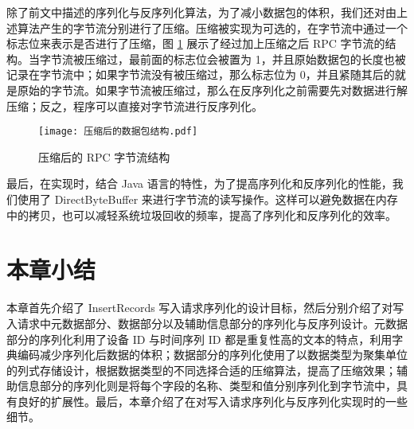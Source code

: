 除了前文中描述的序列化与反序列化算法，为了减小数据包的体积，我们还对由上述算法产生的字节流分别进行了压缩。压缩被实现为可选的，在字节流中通过一个标志位来表示是否进行了压缩，图 \ref{fig:compress-rpc-buffers} 展示了经过加上压缩之后 RPC 字节流的结构。当字节流被压缩过，最前面的标志位会被置为 1，并且原始数据包的长度也被记录在字节流中；如果字节流没有被压缩过，那么标志位为 0，并且紧随其后的就是原始的字节流。如果字节流被压缩过，那么在反序列化之前需要先对数据进行解压缩；反之，程序可以直接对字节流进行反序列化。

\begin{figure}
  \centering
  \texttt{[image: 压缩后的数据包结构.pdf]}
  \caption{压缩后的 RPC 字节流结构}
  \label{fig:compress-rpc-buffers}
\end{figure}

最后，在实现时，结合 Java 语言的特性，为了提高序列化和反序列化的性能，我们使用了 DirectByteBuffer 来进行字节流的读写操作。这样可以避免数据在内存中的拷贝，也可以减轻系统垃圾回收的频率，提高了序列化和反序列化的效率。

\section{本章小结}
本章首先介绍了 InsertRecords 写入请求序列化的设计目标，然后分别介绍了对写入请求中元数据部分、数据部分以及辅助信息部分的序列化与反序列设计。元数据部分的序列化利用了设备 ID 与时间序列 ID 都是重复性高的文本的特点，利用字典编码减少序列化后数据的体积；数据部分的序列化使用了以数据类型为聚集单位的列式存储设计，根据数据类型的不同选择合适的压缩算法，提高了压缩效果；辅助信息部分的序列化则是将每个字段的名称、类型和值分别序列化到字节流中，具有良好的扩展性。最后，本章介绍了在对写入请求序列化与反序列化实现时的一些细节。